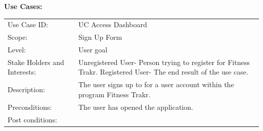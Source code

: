 \documentclass[10pt]{article}
\begin{document}
\textbf{Use Cases:}
\begin{longtable}[]{@{}ll@{}}
\toprule
\begin{minipage}[t]{0.47\columnwidth}\raggedright\strut
Use Case ID:\strut
\end{minipage} & \begin{minipage}[t]{0.47\columnwidth}\raggedright\strut
UC Access Dashboard\strut
\end{minipage}\tabularnewline
\begin{minipage}[t]{0.47\columnwidth}\raggedright\strut
Scope:\strut
\end{minipage} & \begin{minipage}[t]{0.47\columnwidth}\raggedright\strut
Sign Up Form\strut
\end{minipage}\tabularnewline
\begin{minipage}[t]{0.47\columnwidth}\raggedright\strut
Level:\strut
\end{minipage} & \begin{minipage}[t]{0.47\columnwidth}\raggedright\strut
User goal\strut
\end{minipage}\tabularnewline
\begin{minipage}[t]{0.47\columnwidth}\raggedright\strut
Stake Holders and Interests:\strut
\end{minipage} & \begin{minipage}[t]{0.47\columnwidth}\raggedright\strut
Unregistered User- Person trying to register for Fitness Trakr.
Registered User- The end result of the use case.
\strut
\end{minipage}\tabularnewline
\begin{minipage}[t]{0.47\columnwidth}\raggedright\strut
Description:\strut
\end{minipage} & \begin{minipage}[t]{0.47\columnwidth}\raggedright\strut
The user signs up to for a user account within the program Fitness Trakr.\strut
\end{minipage}\tabularnewline
\begin{minipage}[t]{0.47\columnwidth}\raggedright\strut
Preconditions:\strut
\end{minipage} & \begin{minipage}[t]{0.47\columnwidth}\raggedright\strut
The user has opened the application.\strut
\end{minipage}\tabularnewline
\begin{minipage}[t]{0.47\columnwidth}\raggedright\strut
Post conditions:\strut
\end{minipage} & \begin{minipage}[t]{0.47\columnwidth}\raggedright\strut

\end{minipage}
\end{longtable}
\end{document}
